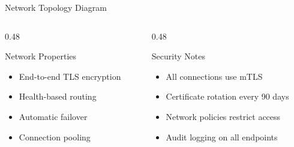 \begin{frame}{Network Topology Diagram}
  \begin{columns}[T]
    \begin{column}{0.48\textwidth}
      \begin{block}{Network Properties}
        \scriptsize
        \begin{itemize}
          \setlength{\itemsep}{0pt}
          \item End-to-end TLS encryption
          \item Health-based routing
          \item Automatic failover
          \item Connection pooling
        \end{itemize}
      \end{block}
    \end{column}
    \begin{column}{0.48\textwidth}
      \begin{alertblock}{Security Notes}
        \scriptsize
        \begin{itemize}
          \setlength{\itemsep}{0pt}
          \item All connections use mTLS
          \item Certificate rotation every 90 days
          \item Network policies restrict access
          \item Audit logging on all endpoints
        \end{itemize}
      \end{alertblock}
    \end{column}
  \end{columns}
\end{frame}

